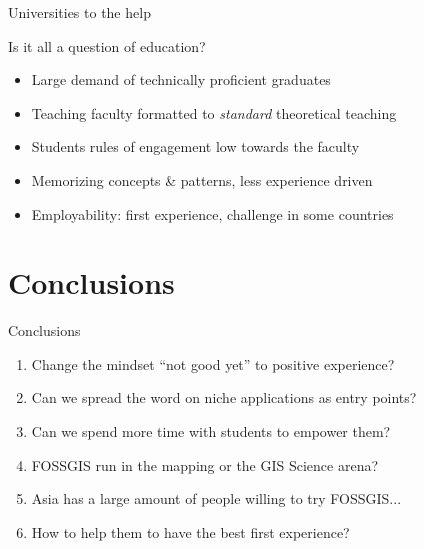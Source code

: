 \documentclass[xcolor=dvipsnames,beamer]{beamer} %
\begin{document}
\begin{frame}[fragile]{Universities to the help}

\begin{block}{Is it all a question of education?}
\begin{itemize}
 \item Large demand of technically proficient graduates
 \item Teaching faculty formatted to {\it standard} theoretical teaching
 \item Students rules of engagement low towards the faculty
 \item Memorizing concepts \& patterns, less experience driven
 \item Employability: first experience, challenge in some countries
\end{itemize}
\end{block}

\end{frame}

\section{Conclusions}
\begin{frame}[fragile]{Conclusions}

\begin{enumerate}
 \item Change the mindset ``not good yet'' to positive experience?
 \item Can we spread the word on niche applications as entry points?
 \item Can we spend more time with students to empower them?
 \item FOSSGIS run in the mapping or the GIS Science arena?
 \item Asia has a large amount of people willing to try FOSSGIS... 
 \item How to help them to have the best first experience?
\end{enumerate}

\end{frame}
\end{document}
